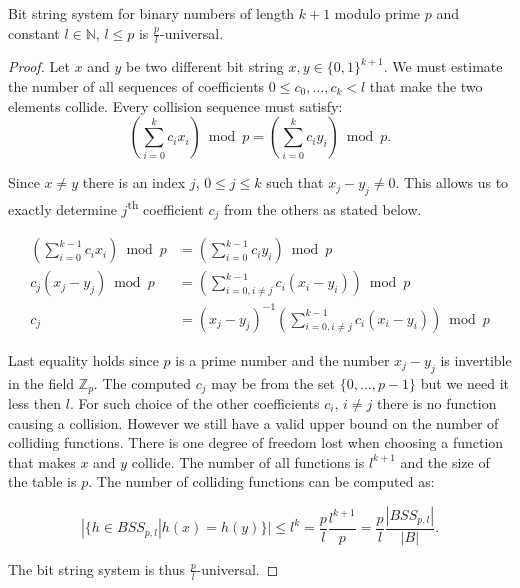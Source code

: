 \begin{remark}
Bit string system for binary numbers of length $k + 1$ modulo prime $p$ and constant $l \in \mathbb{N}$, $l \leq p$ is $\frac{p}{l}$-universal.
\end{remark}
\begin{proof}
Let $x$ and $y$ be two different bit string $x, y \in \{0, 1\} ^ {k + 1}$. We must estimate the number of all sequences of coefficients $0 \leq c_0, \dots, c_k < l$ that make the two elements collide. Every collision sequence must satisfy:
\[
\left( \displaystyle \sum_{i = 0}^{k} c_i x_i \right) \bmod p = \left( \displaystyle \sum_{i = 0}^{k} c_i y_i \right) \bmod p \text{.}
\]

Since $x \neq y$ there is an index $j$, $0 \leq j \leq k$ such that $x_j - y_j \neq 0$. This allows us to exactly determine $j$\textsuperscript{th} coefficient $c_j$ from the others as stated below.

\begin{displaymath}
\begin{split}
\left(\displaystyle \sum_{i=0}^{k-1} c_i x_i\right) \bmod p & = \left(\displaystyle \sum_{i=0}^{k-1} c_i y_i\right) \bmod p \\
c_j(x_j - y_j) \bmod p & = \left(\displaystyle \sum_{i=0, i \neq j}^{k-1} c_i (x_i - y_i)\right) \bmod p \\
c_j & = (x_j - y_j) ^ {-1}\left(\displaystyle \sum_{i=0, i \neq j}^{k-1} c_i (x_i - y_i)\right) \bmod p
\end{split}
\end{displaymath}

Last equality holds since $p$ is a prime number and the number $x_j - y_j$ is invertible in the field $\mathbb{Z}_p$. The computed $c_j$ may be from the set $\{0, \dots, p - 1\}$ but we need it less then $l$. For such choice of the other coefficients $c_i$, $i \neq j$ there is no function causing a collision. However we still have a valid upper bound on the number of colliding functions. There is one degree of freedom lost when choosing a function that makes $x$ and $y$ collide. The number of all functions is $l ^ {k + 1}$ and the size of the table is $p$. The number of colliding functions can be computed as:

\begin{displaymath}
|\{h \in BSS_{p, l} | h(x) = h(y) \}| \leq l^{k} = \frac{p}{l}\frac{l^{k + 1}}{p} = \frac{p}{l}\frac{|BSS_{p, l}|}{|B|} \textit{.}
\end{displaymath}

The bit string system is thus $\frac{p}{l}$-universal.
\end{proof}

